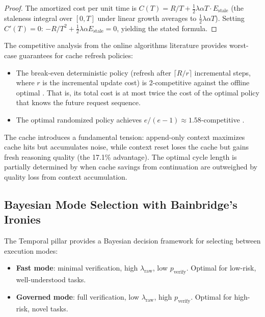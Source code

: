 \documentclass[11pt, a4paper, logo, copyright]{googledeepmind}
\begin{document}
\begin{proof}
The amortized cost per unit time is $C(T) = R/T + \frac{1}{2}\lambda\alpha T \cdot E_{\mathrm{stale}}$ (the staleness integral over $[0, T]$ under linear growth averages to $\frac{1}{2}\lambda\alpha T$). Setting $C'(T) = 0$: $-R/T^2 + \frac{1}{2}\lambda\alpha E_{\mathrm{stale}} = 0$, yielding the stated formula.
\end{proof}

The competitive analysis from the online algorithms literature provides worst-case guarantees for cache refresh policies:

\begin{itemize}[nosep]
    \item The break-even deterministic policy (refresh after $\lceil R/r \rceil$ incremental steps, where $r$ is the incremental update cost) is 2-competitive against the offline optimal \citep{sleator1985amortized}. That is, its total cost is at most twice the cost of the optimal policy that knows the future request sequence.
    \item The optimal randomized policy achieves $e/(e-1) \approx 1.58$-competitive \citep{fiat1991competitive}.
\end{itemize}

The cache introduces a fundamental tension: append-only context maximizes cache hits but accumulates noise, while context reset loses the cache but gains fresh reasoning quality (the 17.1\% advantage). The optimal cycle length is partially determined by when cache savings from continuation are outweighed by quality loss from context accumulation.

\subsection{Bayesian Mode Selection with Bainbridge's Ironies}

The Temporal pillar provides a Bayesian decision framework for selecting between execution modes:

\begin{itemize}[nosep]
    \item \textbf{Fast mode}: minimal verification, high $\lambda_{\text{raw}}$, low $p_{\text{verify}}$. Optimal for low-risk, well-understood tasks.
    \item \textbf{Governed mode}: full verification, low $\lambda_{\text{raw}}$, high $p_{\text{verify}}$. Optimal for high-risk, novel tasks.
\end{itemize}
\end{document}
